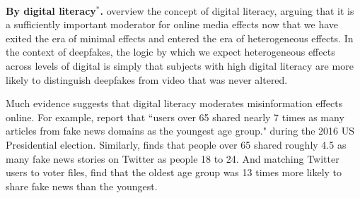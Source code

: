\documentclass[12pt,letterpaper]{article}
\begin{document}
\\[-1.5em]






\noindent \textbf{By digital literacy$^{*}$.} \cite{guess2020see} overview the concept of digital literacy, arguing that it is a sufficiently important moderator for online media effects now that we have exited the era of minimal effects and entered the era of heterogeneous effects. In the context of deepfakes, the logic by which we expect heterogeneous effects across levels of digital is simply that subjects with high digital literacy are more likely to distinguish deepfakes from video that was never altered. 

Much evidence suggests that digital literacy moderates misinformation effects online. %
For example, %
\cite{guess19} report that ``users over 65 shared nearly 7 times as many articles from fake news domains as the youngest age group." during the 2016 US Presidential election. Similarly, \cite{barbera2018explaining} finds that people over 65 shared roughly 4.5 as many fake news stories on Twitter as people 18 to 24. And matching Twitter users to voter files, \cite{osmundsen2020partisan}  find that the oldest age group was 13 times more likely to share fake news than the youngest. %
 
\end{document}
